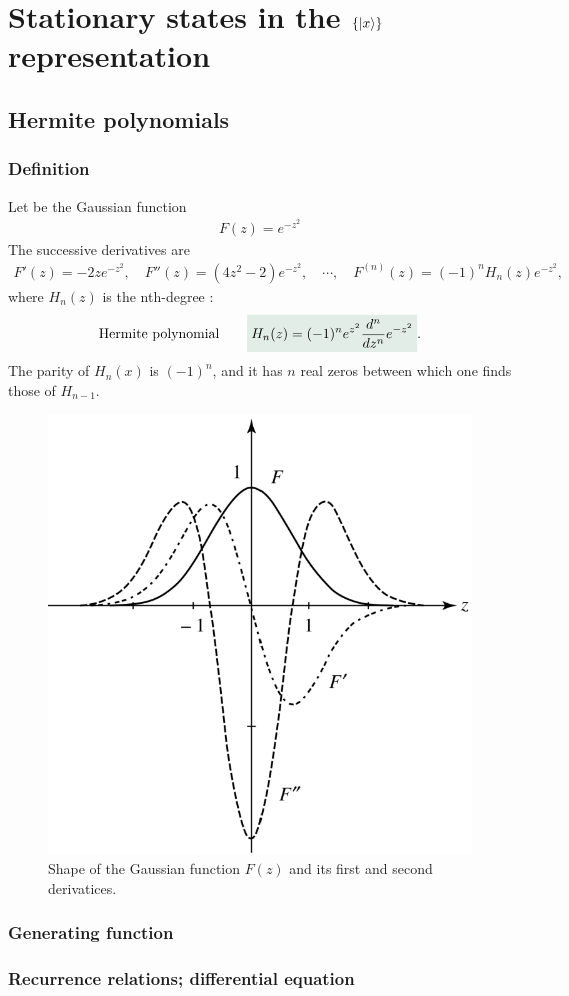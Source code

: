 \section{Stationary states in the $\{|x\rangle\}$ representation}
\subsection{Hermite polynomials}

\subsubsection{Definition}
Let be the Gaussian function 
\begin{align}
    F(z)=e^{-z^2}
\end{align}
The successive derivatives are 
\begin{align*}
    F'(z)=-2ze^{-z^2},\quad F''(z)=(4z^2-2)e^{-z^2},\quad\cdots,\quad F^{(n)}(z)=(-1)^nH_n(z)e^{-z^2},
\end{align*}
where $H_n(z)$ is the nth-degree :
\begin{align}
    \text{Hermite polynomial}\qquad\highlight{H_n(z)=(-1)^ne^{z^2}\frac{d^n}{dz^n}e^{-z^2}}.
\end{align}
The parity of $H_n(x)$ is $(-1)^n$, and it has $n$ real zeros between which one finds those of $H_{n-1}$.
\begin{figure}[h!]
    \centering
    \includegraphics[width=.4\columnwidth]{PartOne/ChapterThree/gaussianandf.png}
    \caption{Shape of the Gaussian function $F(z)$ and its first and second derivatices.}
\end{figure}

\subsubsection{Generating function}



\subsubsection{Recurrence relations; differential equation}





